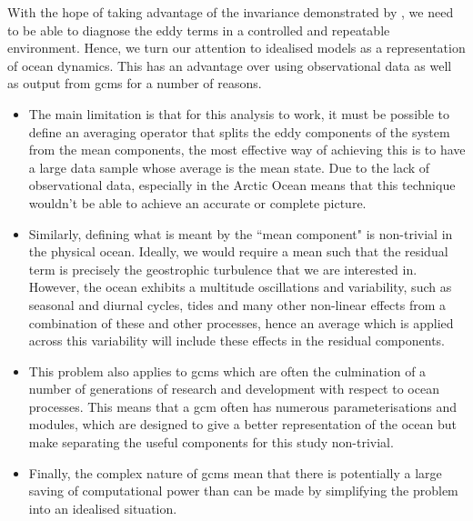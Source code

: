 \documentclass[10pt,a4paper]{report}
\begin{document}
With the hope of taking advantage of the invariance demonstrated by 
\cite{maddison2013eliassen}, we need to be able to diagnose the
eddy terms in a controlled and repeatable environment. Hence, we turn our attention to
idealised models as a representation of ocean dynamics. This has an advantage 
over using observational data as well as output from \glspl{gcm} for a number of reasons.
\begin{itemize}
	\item The main limitation is that for this analysis to work, it must be possible to define an
	averaging operator that splits the eddy components of the system from the mean
	components, the most effective way of achieving this is to have a large data sample
	whose average is the mean state. Due to the lack of observational data, especially in the
	Arctic Ocean means that this  technique wouldn't be able to achieve an accurate or complete
	picture. 
	\item Similarly, defining what is meant by the ``mean component" is non-trivial in the physical ocean. Ideally, we would require a mean such that the residual term is precisely the 
	geostrophic turbulence that we are interested in. However, the ocean exhibits a multitude 
	oscillations and variability, such as seasonal and diurnal cycles, tides and many other
	non-linear effects from a combination of these and other processes, hence an average which
	is applied across this variability will include these effects in the residual components.
	\item This problem also applies to \glspl{gcm} which are often the culmination of 
	a number of generations of research and development with respect to ocean processes.
	This means that a \gls{gcm} often has numerous parameterisations and modules, which are
	designed to give a better representation of the ocean but make separating the useful components
	for this study non-trivial. 
	\item Finally, the complex nature of \glspl{gcm} mean that there is potentially a large saving
	of computational power than can be made by simplifying the problem into an idealised situation.
\end{itemize}
\end{document}
